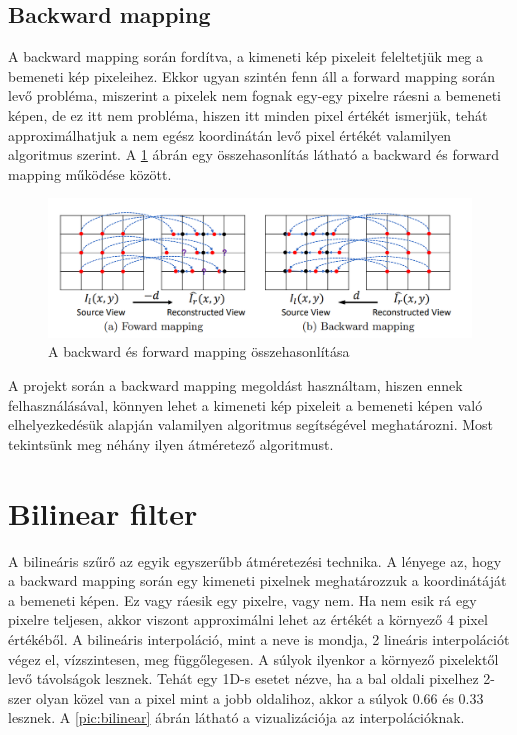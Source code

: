 \subsection{Backward mapping}

A backward mapping során fordítva, a kimeneti kép pixeleit feleltetjük meg a bemeneti kép pixeleihez. Ekkor ugyan szintén fenn áll a forward mapping során levő probléma, miszerint a pixelek nem fognak egy-egy pixelre ráesni a bemeneti képen, de ez itt nem probléma, hiszen itt minden pixel értékét ismerjük, tehát approximálhatjuk a nem egész koordinátán levő pixel értékét valamilyen algoritmus szerint. A \ref{pic:mapping} ábrán egy összehasonlítás látható a backward és forward mapping működése között.

\begin{figure}[!ht]
	\centering
	\includegraphics[width=120mm, keepaspectratio]{figures/mapping.png}
	\caption{A backward és forward mapping összehasonlítása \cite{forwardbackward}} 
	\label{pic:mapping}
\end{figure}

A projekt során a backward mapping megoldást használtam, hiszen ennek felhasználásával, könnyen lehet a kimeneti kép pixeleit a bemeneti képen való elhelyezkedésük alapján valamilyen algoritmus segítségével  meghatározni. Most tekintsünk meg néhány ilyen átméretező algoritmust.

\section{Bilinear filter}

A bilineáris szűrő az egyik egyszerűbb átméretezési technika. A lényege az, hogy a backward mapping során egy kimeneti pixelnek meghatározzuk a koordinátáját a bemeneti képen. Ez vagy ráesik egy pixelre, vagy nem. Ha nem esik rá egy pixelre teljesen, akkor viszont approximálni lehet az értékét a környező 4 pixel értékéből. A bilineáris interpoláció, mint a neve is mondja, 2 lineáris interpolációt végez el, vízszintesen, meg függőlegesen. A súlyok ilyenkor a környező pixelektől levő távolságok lesznek. Tehát egy 1D-s esetet nézve, ha a bal oldali pixelhez 2-szer olyan közel van a pixel mint a jobb oldalihoz, akkor a súlyok 0.66 és 0.33 lesznek. \cite{Wikipediabilinear_2024} A \ref{pic:bilinear} ábrán látható a vizualizációja az interpolációknak.


